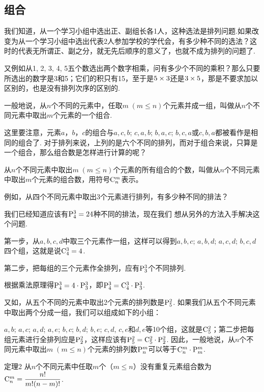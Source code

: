 \subsection{组合}
我们知道，从一个学习小组中选出正、副组长各1人，这种选法是排列问题.如果改变为从一个学习小组中选出代表2人参加学校的学代会，有多少种不同的选法？这时的代表无所谓正、副之分，就无先后顺序的意义了，也就不成为排列的问题了.

又例如从1, 2, 3, 4, 5五个数选出两个数字相乘，问有多少个不同的乘积？那么只要所选出的数字是3和5；它们的积只有15，至于是$5\times3$还是$3\times5$，那是不要求加以区别的，也是没有排列次序的区别的.

一般地说，从$n$个不同的元素中，任取$m\; (m\le n)$个元素并成一组，叫做从$n$个不同元素中取出$m$个元素的一个组合.

这里要注意，元素$a$，$b$，$c$的组合与$a,c,b$; $c,a,b$; $b,a,c$; $b,c,a$或$c,b,a$都被看作是相同的组合了. 对于排列来说，上列的是六个不同的排列，而对于组合来说，只算是一个组合，那么组合数是怎样进行计算的呢？

从$n$个不同元素中取出$m\; (m\le n)$个元素的所有组合的个数，叫做从$n$个不同元素中取出$m$个元素的组合数，用符号${\rm C}^{m}_{n}$表示。

例如，从四个不同元素中取出3个元素进行排列，有多少种不同的排法？

我们已经知道应该有${\rm P}^{3}_{4}=24$种不同的排法，现在我们
想从另外的方法入手解决这个问题.

第一步，从$a,b,c,d$中取三个元素作一组，这样可以得到$a,b,c$; $a,b,d$; $a,c,d$; $b,c,d$四个组，这就是说${\rm C}^{3}_{4}=4$.

第二步，把每组的三个元素作全排列，应有${\rm P}^{3}_{3}$个不同排列.

根据乘法原理得${\rm P}^{3}_{4}=4\cdot {\rm P}^{3}_{3}$，即${\rm P}^{3}_{4}={\rm C}^{3}_{4}\cdot {\rm P}^{3}_{3}$.

又如，从五个不同的元素中取出2个元素的排列数是${\rm P}^{2}_{5}$. 如果我们从五个不同元素中取出两个分成一组，我们可以组成如下的小组：

$a,b$; $a,c$; $a,d$; $a,e$; $b,c$; $b,d$; $b,e$; $c,d$, $c,e$和$d,e$等10个组，这就是${\rm C}^{2}_{5}$；第二步把每组元素进行全排列应是${\rm P}^{2}_{2}$，这样应该有${\rm P}^{2}_{5}={\rm C}^{2}_{5}\cdot {\rm P}^{2}_{2}$. 因此，一般地说，从$n$个不同元素中取出$m\; (m\le n)$个元素的排列数${\rm P}^{m}_{n}$可以等于${\rm C}^{m}_{n}\cdot {\rm P}^{m}_{m}$.


\begin{blk}
  {定理2} 从$n$个不同元素中任取$m$个（$m\le n$）没有重复元素组合数为${\rm C}^{m}_{n}=\dfrac{n!}{m!(n-m)!}$.  
\end{blk}

